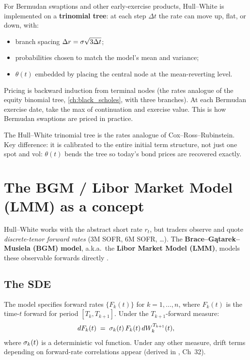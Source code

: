 For Bermudan swaptions and other early-exercise products, Hull--White
is implemented on a \textbf{trinomial tree}: at each step $\Delta t$
the rate can move up, flat, or down, with:
\begin{itemize}
  \item branch spacing $\Delta r = \sigma\sqrt{3\Delta t}$;
  \item probabilities chosen to match the model's mean and variance;
  \item $\theta(t)$ embedded by placing the central node at the
    mean-reverting level.
\end{itemize}
Pricing is backward induction from terminal nodes (the rates analogue
of the equity binomial tree, \cref{ch:black_scholes}, with three
branches).  At each Bermudan exercise date, take the max of
continuation and exercise value.  This is how Bermudan swaptions are
priced in practice.

\begin{intuitionbox}
The Hull--White trinomial tree is the rates analogue of
Cox--Ross--Rubinstein.  Key difference: it is calibrated to the
entire initial term structure, not just one spot and vol: $\theta(t)$
bends the tree so today's bond prices are recovered exactly.
\end{intuitionbox}


\section{The BGM / Libor Market Model (LMM) as a concept}
\label{sec:bgm}

Hull--White works with the abstract short rate $r_t$, but traders
observe and quote \emph{discrete-tenor forward rates} (3M SOFR, 6M
SOFR, \ldots).  The \textbf{Brace--G\k{a}tarek--Musiela (BGM) model},
a.k.a.\ the \textbf{Libor Market Model (LMM)}, models these
observable forwards directly \citeBGM.

\subsection{The SDE}

The model specifies forward rates $\{F_k(t)\}$ for $k=1,\ldots,n$,
where $F_k(t)$ is the time-$t$ forward for period $[T_k, T_{k+1}]$.
Under the $T_{k+1}$-forward measure:
\begin{equation}
  dF_k(t) \;=\; \sigma_k(t)\, F_k(t)\, dW_k^{T_{k+1}}(t),
  \label{eq:bgm_sde}
\end{equation}
where $\sigma_k(t)$ is a deterministic vol function.  Under any other
measure, drift terms depending on forward-rate correlations appear
(derived in \citeHull, Ch~32).

